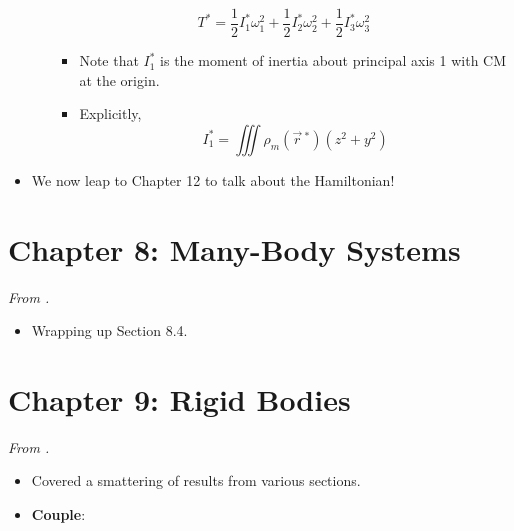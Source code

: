 \documentclass[../notes.tex]{subfiles}
\begin{document}
\begin{itemize}
\begin{itemize}
        \begin{equation*}
            T^* = \frac{1}{2}I_1^*\omega_1^2+\frac{1}{2}I_2^*\omega_2^2+\frac{1}{2}I_3^*\omega_3^2
        \end{equation*}
        \begin{itemize}
            \item Note that $I_1^*$ is the moment of inertia about principal axis 1 with CM at the origin.
            \item Explicitly,
            \begin{equation*}
                I_1^* = \iiint\rho_m(\vec{r}{\,}^*)(z^2+y^2)
            \end{equation*}
        \end{itemize}
    \end{itemize}
    \item We now leap to Chapter 12 to talk about the Hamiltonian!
\end{itemize}



\section{Chapter 8: Many-Body Systems}
\emph{From \textcite{bib:KibbleBerkshire}.}
\begin{itemize}
    \item {}Wrapping up Section 8.4.
\end{itemize}



\section{Chapter 9: Rigid Bodies}
\emph{From \textcite{bib:KibbleBerkshire}.}
\begin{itemize}
    \item Covered a smattering of results from various sections.
    \item \textbf{Couple}: 
\end{itemize}
\end{document}

